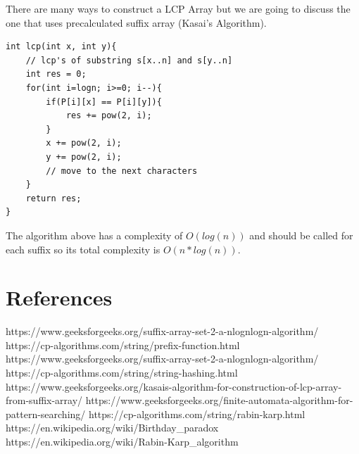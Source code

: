 \documentclass[12pt]{article}
\begin{document}
    	There are many ways to construct a LCP Array but we are going to discuss the one that uses precalculated suffix array (Kasai's Algorithm).
    	
\begin{verbatim}
int lcp(int x, int y){
    // lcp's of substring s[x..n] and s[y..n]
    int res = 0;
    for(int i=logn; i>=0; i--){
        if(P[i][x] == P[i][y]){
            res += pow(2, i);
        }
        x += pow(2, i);
        y += pow(2, i);
        // move to the next characters
    }
    return res;
}
\end{verbatim}

    The algorithm above has a complexity of $O(log(n))$ and should be called for each suffix so its total complexity is $O(n*log(n))$.
    	
       \newpage
	   \section{References}
    	
    	\begin{thebibliography}{0}
    		
    		https://www.geeksforgeeks.org/suffix-array-set-2-a-nlognlogn-algorithm/
    		https://cp-algorithms.com/string/prefix-function.html
    		https://www.geeksforgeeks.org/suffix-array-set-2-a-nlognlogn-algorithm/
    		https://cp-algorithms.com/string/string-hashing.html
    		https://www.geeksforgeeks.org/kasais-algorithm-for-construction-of-lcp-array-from-suffix-array/
    		https://www.geeksforgeeks.org/finite-automata-algorithm-for-pattern-searching/
    		https://cp-algorithms.com/string/rabin-karp.html
    		https://en.wikipedia.org/wiki/Birthday_paradox
    		https://en.wikipedia.org/wiki/Rabin-Karp_algorithm
    	\end{thebibliography}
    
    
\end{document}
